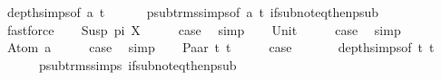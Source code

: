 \begin{isabellebody}
\ depth{\isachardot}{\kern0pt}simps{\isacharparenleft}{\kern0pt}{}{\isacharparenright}{\kern0pt}{\isacharbrackleft}{\kern0pt}of\ a\ t{\isacharbrackright}{\kern0pt}\isanewline
\ \ \ \ \ \ psub{\isacharunderscore}{\kern0pt}trms{\isachardot}{\kern0pt}simps{\isacharparenleft}{\kern0pt}{}{\isacharparenright}{\kern0pt}{\isacharbrackleft}{\kern0pt}of\ a\ t{\isacharbrackright}{\kern0pt}\ if{\isacharunderscore}{\kern0pt}sub{\isacharunderscore}{\kern0pt}not{\isacharunderscore}{\kern0pt}eq{\isacharunderscore}{\kern0pt}then{\isacharunderscore}{\kern0pt}psub\isanewline
\ \ \ \ \isamarkupfalse%
\ fastforce\isanewline
{}\isamarkupfalse%
\isanewline
\ \ \isamarkupfalse%
\ {\isacharparenleft}{\kern0pt}Susp\ pi\ X{\isacharparenright}{\kern0pt}\isanewline
\ \ \isamarkupfalse%
\ \isamarkupfalse%
\ {\isacharquery}{\kern0pt}case\ \isamarkupfalse%
\ simp\isanewline
{}\isamarkupfalse%
\isanewline
\ \ \isamarkupfalse%
\ Unit\isanewline
\ \ \isamarkupfalse%
\ \isamarkupfalse%
\ {\isacharquery}{\kern0pt}case\ \isamarkupfalse%
\ simp\isanewline
{}\isamarkupfalse%
\isanewline
\ \ \isamarkupfalse%
\ {\isacharparenleft}{\kern0pt}Atom\ a{\isacharparenright}{\kern0pt}\isanewline
\ \ \isamarkupfalse%
\ \isamarkupfalse%
\ {\isacharquery}{\kern0pt}case\ \isamarkupfalse%
\ simp\isanewline
{}\isamarkupfalse%
\isanewline
\ \ \isamarkupfalse%
\ {\isacharparenleft}{\kern0pt}Paar\ t{}{\isacharprime}{\kern0pt}\ t{}{\isacharprime}{\kern0pt}{\isacharparenright}{\kern0pt}\isanewline
\ \ \isamarkupfalse%
\ \isamarkupfalse%
\ {\isacharquery}{\kern0pt}case\ \isanewline
\ \ \ \ \isamarkupfalse%
\ depth{\isachardot}{\kern0pt}simps{\isacharparenleft}{\kern0pt}{}{\isacharparenright}{\kern0pt}{\isacharbrackleft}{\kern0pt}of\ t{}{\isacharprime}{\kern0pt}\ t{}{\isacharprime}{\kern0pt}{\isacharbrackright}{\kern0pt}\ \isanewline
\ \ \ \ \ \ psub{\isacharunderscore}{\kern0pt}trms{\isachardot}{\kern0pt}simps{\isacharparenleft}{\kern0pt}{}{\isacharparenright}{\kern0pt}\ if{\isacharunderscore}{\kern0pt}sub{\isacharunderscore}{\kern0pt}not{\isacharunderscore}{\kern0pt}eq{\isacharunderscore}{\kern0pt}then{\isacharunderscore}{\kern0pt}psub\ \isamarkupfalse%

\end{isabellebody}
